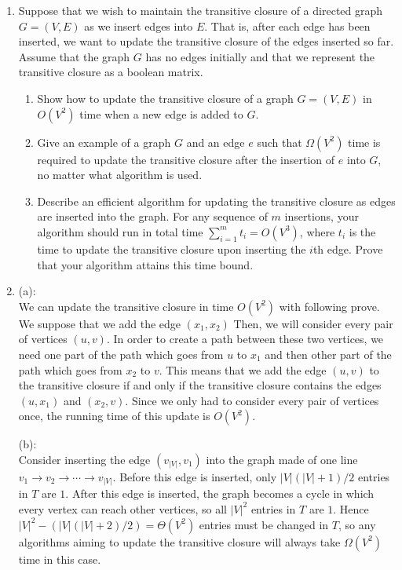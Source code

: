 \documentclass[12pt,a4paper]{article}
\makeatletter
\newtheorem*{solution}{Solution}
\theoremstyle{definition}
\renewenvironment{solution}[1][Solution] {\par\pushQED{\qed}\normalfont\topsep6\p@\@plus6\p@\relax\trivlist\item[\hskip\labelsep\bfseries#1\@addpunct{.}]\ignorespaces}{\popQED\endtrivlist\@endpefalse} \makeatother
\makeatother
\begin{document}
\begin{enumerate}
	
	\item Suppose that we wish to maintain the transitive closure of a directed graph $G=(V,E)$ as we insert edges into $E$. That is, after each edge has been inserted, we want to update the transitive closure of the edges inserted so far. Assume that the graph $G$ has no edges initially and that we represent the transitive closure as a boolean matrix.
	\begin{enumerate}
	    \item Show how to update the transitive closure of a graph $G=(V,E)$ in $O(V^2)$ time when a new edge is added to $G$.
	    \item Give an example of a graph $G$ and an edge $e$ such that $\Omega(V^2)$ time is required to update the transitive closure after the insertion of $e$ into $G$, no matter what algorithm is used.
	    \item Describe an efficient algorithm for updating the transitive closure as edges are inserted into the graph. For any sequence of $m$ insertions, your algorithm should run in total time $\sum_{i=1}^m t_i=O(V^3)$, where $t_i$ is the time to update the transitive closure upon inserting the $i$th edge. Prove that your algorithm attains this time bound.
	\end{enumerate}
	
	\begin{solution}
    (a):\\
    We can update the transitive closure in time $O\left(V^2\right)$ with following prove. We suppose that we add the edge $\left(x_1, x_2\right)$ 
    Then, we will consider every pair of vertices $\left(u, v\right)$. In order to create a path between these two vertices, we need one part of the path which goes from $u$ to $x_1$
    and then other part of the path which goes from $x_2$
    to $v$. This means that we add the edge $\left(u, v\right)$ to the transitive closure if and only if the transitive closure contains the edges $\left(u, x_1\right)$ and $\left(x_2, v\right)$. Since we only had to consider every pair of vertices once, the running time of this update is $O\left(V^2\right)$.

    (b):\\
    Consider inserting the edge $(v_{|V|}, v_1)$ into the graph made of one line $v_1 \to v_2 \to \cdots \to v_{|V|}$.
    Before this edge is inserted, only $|V|(|V| + 1) / 2$ entries in $T$ are $1$. After this edge is inserted, the graph becomes a cycle in which every vertex can reach other vertices, so all $|V|^2$ entries in $T$ are $1$. Hence $|V|^2 - (|V|(|V| + 2) / 2) = \Theta(V^2)$ entries must be changed in $T$, so any algorithms aiming to update the transitive closure will always take $\Omega(V^2)$ time in this case.
    


\end{solution}
\end{enumerate}
\end{document}

